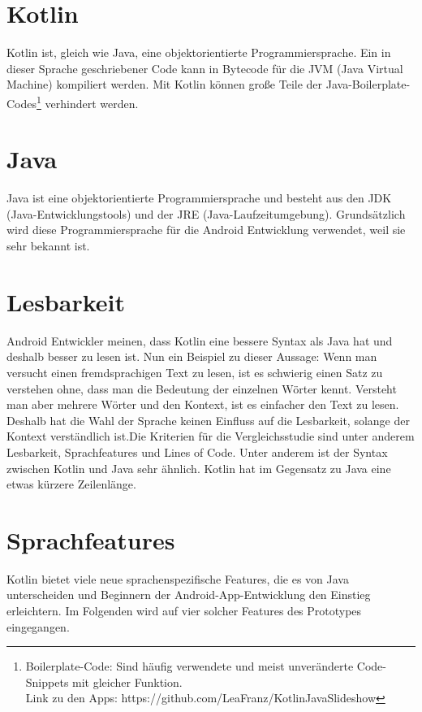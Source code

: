 \documentclass{sigchi-ext}
\begin{document}
\section{Kotlin}
Kotlin ist, gleich wie Java, eine objektorientierte Programmiersprache. Ein in dieser Sprache geschriebener Code kann 
in Bytecode für die JVM (Java Virtual Machine) kompiliert werden. Mit Kotlin können große Teile der
Java-Boilerplate-Codes\footnote{Boilerplate-Code: Sind häufig verwendete und meist unveränderte Code-Snippets mit
gleicher Funktion. \\Link zu den Apps: https://github.com/LeaFranz/KotlinJavaSlideshow} verhindert werden.\cite{boilerplate}

\section{Java}
Java ist eine objektorientierte Programmiersprache und besteht aus den JDK (Java-Entwicklungstools) und der JRE
 (Java-Laufzeitumgebung). Grundsätzlich wird diese Programmiersprache für die Android Entwicklung 
 verwendet, weil sie sehr bekannt ist. \cite{banerjee2018comparative}

\section{Lesbarkeit}
Android Entwickler meinen, dass Kotlin eine bessere Syntax als Java hat und deshalb besser
zu lesen ist. Nun ein Beispiel zu dieser Aussage: Wenn man versucht einen fremdsprachigen
Text zu lesen, ist es schwierig einen Satz zu verstehen ohne, dass man die Bedeutung der
einzelnen Wörter kennt. Versteht man aber mehrere Wörter und den Kontext, ist es einfacher den
Text zu lesen. Deshalb hat die Wahl der Sprache keinen Einfluss auf die Lesbarkeit, solange
der Kontext verständlich ist.Die Kriterien für die Vergleichsstudie sind unter anderem Lesbarkeit,
Sprachfeatures und Lines of Code. Unter anderem ist der Syntax zwischen Kotlin und Java sehr ähnlich.
Kotlin hat im Gegensatz zu Java eine etwas kürzere Zeilenlänge.

\section{Sprachfeatures}
Kotlin bietet viele neue sprachenspezifische Features, die es von Java unterscheiden und Beginnern der Android-App-Entwicklung den Einstieg erleichtern. Im Folgenden wird auf vier solcher Features des Prototypes eingegangen.
\end{document}
